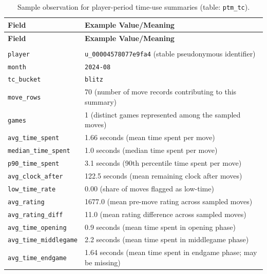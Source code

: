 \documentclass[
  12pt]{article}
\newcommand{\us}{\_\allowbreak}
\begin{document}
\begin{xltabular}{\textwidth}{>{\raggedright\arraybackslash}p{3.4cm} X}
\caption{Sample observation for player-period time-use summaries (table: \texttt{ptm\us tc}).}\label{tab:obs-player-timeuse}\\
\toprule
\textbf{Field} & \textbf{Example Value/Meaning} \\
\midrule
\endfirsthead

\toprule
\textbf{Field} & \textbf{Example Value/Meaning} \\
\midrule
\endhead

\midrule
{} \\
\endfoot

\bottomrule
\endlastfoot

\texttt{player} & \texttt{u\us 00004578077e9fa4} (stable pseudonymous identifier) \\
\texttt{month} & \texttt{2024-08} \\
\texttt{tc\us bucket} & \texttt{blitz} \\
\texttt{move\us rows} & 70 (number of move records contributing to this summary) \\
\texttt{games} & 1 (distinct games represented among the sampled moves) \\
\texttt{avg\us time\us spent} & 1.66 seconds (mean time spent per move) \\
\texttt{median\us time\us spent} & 1.0 seconds (median time spent per move) \\
\texttt{p90\us time\us spent} & 3.1 seconds (90th percentile time spent per move) \\
\texttt{avg\us clock\us after} & 122.5 seconds (mean remaining clock after moves) \\
\texttt{low\us time\us rate} & 0.00 (share of moves flagged as low-time) \\
\texttt{avg\us rating} & 1677.0 (mean pre-move rating across sampled moves) \\
\texttt{avg\us rating\us diff} & 11.0 (mean rating difference across sampled moves) \\
\texttt{avg\us time\us opening} & 0.9 seconds (mean time spent in opening phase) \\
\texttt{avg\us time\us middlegame} & 2.2 seconds (mean time spent in middlegame phase) \\
\texttt{avg\us time\us endgame} & 1.64 seconds (mean time spent in endgame phase; may be missing) \\
\end{xltabular}
\end{document}

